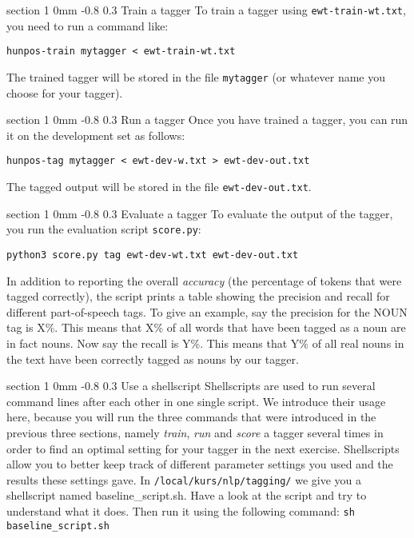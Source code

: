 \documentclass[11pt]{article}
\makeatletter
\newcommand{\newsec}[2]{\section{#1}\label{sec:#2}\noindent}
\renewcommand{\section}{\@startsection
{section}%
{1}%
{0mm}%
{-0.8\baselineskip}%
{0.3\baselineskip}%
{\bfseries\large}}%
\makeatother
\begin{document}
        \newsec{Train a tagger}{train}%
        To train a tagger using {\tt ewt-train-wt.txt}, you need to
        run a command like:
\begin{verbatim}
hunpos-train mytagger < ewt-train-wt.txt
\end{verbatim}
The trained tagger will be stored in the file {\tt mytagger} (or
whatever name you choose for your tagger).

\newsec{Run a tagger}{run}%
Once you have trained a tagger, you can run it on the development set
as follows:
\begin{verbatim}
hunpos-tag mytagger < ewt-dev-w.txt > ewt-dev-out.txt
\end{verbatim}
The tagged output will be stored in the file {\tt ewt-dev-out.txt}.

\newsec{Evaluate a tagger}{eval}%
To evaluate the output of the tagger, you run the evaluation script
{\tt score.py}:
\begin{verbatim}
python3 score.py tag ewt-dev-wt.txt ewt-dev-out.txt
\end{verbatim}
In addition to reporting the overall \emph{accuracy} (the percentage
of tokens that were tagged correctly), the script prints a table
showing the precision and recall for different part-of-speech tags. To
give an example, say the precision for the NOUN tag is X\%. This means
that X\% of all words that have been tagged as a noun are in fact
nouns. Now say the recall is Y\%. This means that Y\% of all real
nouns in the text have been correctly tagged as nouns by our tagger.

\newsec{Use a shellscript}{shell}%
Shellscripts are used to run several command lines after each other in
one single script. We introduce their usage here, because you will run
the three commands that were introduced in the previous three
sections, namely \emph{train}, \emph{run} and \emph{score} a tagger
several times in order to find an optimal setting for your tagger in
the next exercise. Shellscripts allow you to better keep track of
different parameter settings you used and the results these settings
gave. In \texttt{/local/kurs/nlp/tagging/} we give you a shellscript
named baseline\_script.sh. Have a look at the script and try to
understand what it does. Then run it using the following command:
\texttt{sh baseline\_script.sh}
%
%
%
%
%
%
\end{document}
